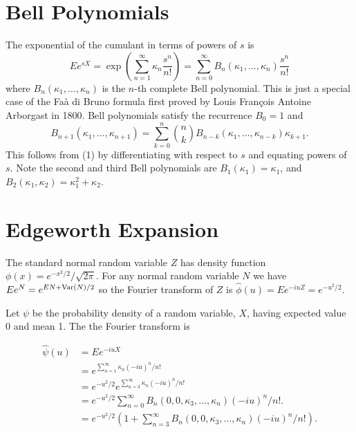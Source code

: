\documentclass[fleqn]{amsart}
\newcommand{\Var}{\mathop{\rm{Var}}}
\theoremstyle{definition}
\begin{document}
\section{Bell Polynomials}

The exponential of the cumulant in terms of
powers of \(s\) is
\begin{equation}
Ee^{sX} =  \exp(\sum_{n=1}^\infty \kappa_n \frac{s^n}{n!})
= \sum_{n=0}^\infty B_n(\kappa_1,\dots,\kappa_n) \frac{s^n}{n!}
\end{equation}\label{eq:1}
where \(B_n(\kappa_1,\dots,\kappa_n)\) is the \(n\)-th complete
Bell polynomial.
This is just a special case of the
Fa\`a di Bruno formula first proved by Louis Fran\c{c}ois Antoine
Arborgast in 1800\cite{Arb1800}.
Bell polynomials satisfy the recurrence \cite{Com1974} \(B_0 = 1\) and
\[
B_{n+1}(\kappa_1,\dots,\kappa_{n+1}) = \sum_{k=0}^n \binom{n}{k}
B_{n - k}(\kappa_1,\dots, \kappa_{n - k}) \kappa_{k+1}.
\]
This follows from (1) by differentiating with respect to \(s\) and equating powers of \(s\).
Note the second and third Bell polynomials are \(B_1(\kappa_1) = \kappa_1\), and
\(B_2(\kappa_1, \kappa_2) = \kappa_1^2 + \kappa_2\).

\section{Edgeworth Expansion}
The standard normal random variable \(Z\) has density function \(\phi(x) =e^{-x^2/2}/\sqrt{2\pi}\). 
For any normal random variable \(N\) we have \(Ee^N = e^{EN + \Var(N)/2}\)
so the Fourier transform of \(Z\) is \(\hat{\phi}(u) = Ee^{-iuZ} = e^{-u^2/2}\).

Let $\psi$ be the probability density of a random variable, $X$,
having expected value 0 and mean 1.
The the Fourier transform is

\begin{align*}
\hat{\psi}(u) &= E e^{-iuX} \\
     &= e^{\sum_{n=1}^\infty \kappa_n (-iu)^n/n!}\\
     &= e^{-u^2/2} e^{\sum_{n=3}^\infty \kappa_n (-iu)^n/n!}\\
     &= e^{-u^2/2} \sum_{n=0}^\infty B_n(0, 0, \kappa_3,...,\kappa_n)(-iu)^n/n!.\\
	  &= e^{-u^2/2} (1 + \sum_{n=3}^\infty B_n(0, 0, \kappa_3,...,\kappa_n)(-iu)^n/n!).\\
\end{align*}
\end{document}
